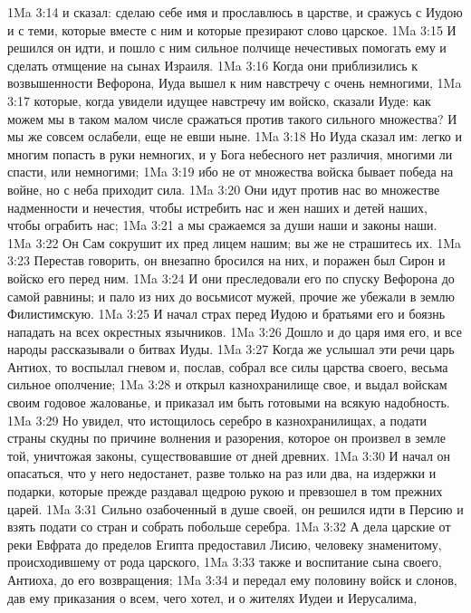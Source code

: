 \vs 1Ma 3:14 и сказал: сделаю себе имя и прославлюсь в царстве, и сражусь с Иудою и с теми, которые вместе с ним и которые презирают слово царское.
\vs 1Ma 3:15 И решился он идти, и пошло с ним сильное полчище нечестивых помогать ему и сделать отмщение на сынах Израиля.
\vs 1Ma 3:16 Когда они приблизились к возвышенности Вефорона, Иуда вышел к ним навстречу с очень немногими,
\vs 1Ma 3:17 которые, когда увидели идущее навстречу им войско, сказали Иуде: как можем мы в таком малом числе сражаться против такого сильного множества? И мы же совсем ослабели, еще не евши ныне.
\vs 1Ma 3:18 Но Иуда сказал им: легко и многим попасть в руки немногих, и у Бога небесного нет различия, многими ли спасти, или немногими;
\vs 1Ma 3:19 ибо не от множества войска бывает победа на войне, но с неба приходит сила.
\vs 1Ma 3:20 Они идут против нас во множестве надменности и нечестия, чтобы истребить нас и жен наших и детей наших, чтобы ограбить нас;
\vs 1Ma 3:21 а мы сражаемся за души наши и законы наши.
\vs 1Ma 3:22 Он Сам сокрушит их пред лицем нашим; вы же не страшитесь их.
\vs 1Ma 3:23 Перестав говорить, он внезапно бросился на них, и поражен был Сирон и войско его перед ним.
\vs 1Ma 3:24 И они преследовали его по спуску Вефорона до самой равнины; и пало из них до восьмисот мужей, прочие же убежали в землю Филистимскую.
\vs 1Ma 3:25 И начал страх перед Иудою и братьями его и боязнь нападать на всех окрестных язычников.
\vs 1Ma 3:26 Дошло и до царя имя его, и все народы рассказывали о битвах Иуды.
\rsbpar\vs 1Ma 3:27 Когда же услышал эти речи царь Антиох, то воспылал гневом и, послав, собрал все силы царства своего, весьма сильное ополчение;
\vs 1Ma 3:28 и открыл казнохранилище свое, и выдал войскам своим годовое жалованье, и приказал им быть готовыми на всякую надобность.
\vs 1Ma 3:29 Но увидел, что истощилось серебро в казнохранилищах, а подати страны скудны по причине волнения и разорения, которое он произвел в земле той, уничтожая законы, существовавшие от дней древних.
\vs 1Ma 3:30 И начал он опасаться, что у него недостанет, разве только на раз или два, на издержки и подарки, которые прежде раздавал щедрою рукою и превзошел в том прежних царей.
\vs 1Ma 3:31 Сильно озабоченный в душе своей, он решился идти в Персию и взять подати со стран и собрать побольше серебра.
\vs 1Ma 3:32 А дела царские от реки Евфрата до пределов Египта предоставил Лисию, человеку знаменитому, происходившему от рода царского,
\vs 1Ma 3:33 также и воспитание сына своего, Антиоха, до его возвращения;
\vs 1Ma 3:34 и передал ему половину войск и слонов, дав ему приказания о всем, чего хотел, и о жителях Иудеи и Иерусалима,
